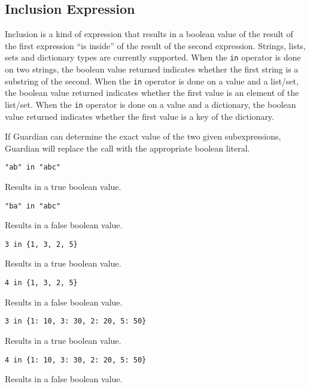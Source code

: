 
\subsection{Inclusion Expression}
{
	Inclusion is a kind of expression that results in a boolean value of
	the result of the first expression ``is inside'' of the result of the
	second expression. Strings, lists, sets and dictionary types are currently
	supported.
	When the \lstinline[language=MAIA, columns=fixed]@in@ operator is done
	on two strings, the boolean value returned
	indicates whether the first string
	is a substring of the second.
	When the \lstinline[language=MAIA, columns=fixed]@in@ operator is done on
	a value and a list/set,
	the boolean value returned indicates whether the first value
	is an element of the list/set.
	When the \lstinline[language=MAIA, columns=fixed]@in@ operator is done on
	a value and a dictionary,
	the boolean value returned indicates whether the first value
	is a key of the dictionary.
	
	If Guardian can determine the exact value of the two given subexpressions,
	Guardian will replace the call with the appropriate boolean literal.
	
	\begin{itemize}
	{
		\item[] \lstinline[language=MAIA, columns=fixed]@"ab" in "abc"@
		
			Results in a true boolean value.
		
		\item[] \lstinline[language=MAIA, columns=fixed]@"ba" in "abc"@
		
			Results in a false boolean value.
		
		\item[] \lstinline[language=MAIA, columns=fixed]@3 in {1, 3, 2, 5}@
		
			Results in a true boolean value.
		
		\item[] \lstinline[language=MAIA, columns=fixed]@4 in {1, 3, 2, 5}@
		
			Results in a false boolean value.
		
		\item[] \lstinline[language=MAIA, columns=fixed]@3 in {1: 10, 3: 30, 2: 20, 5: 50}@
		
			Results in a true boolean value.
		
		\item[] \lstinline[language=MAIA, columns=fixed]@4 in {1: 10, 3: 30, 2: 20, 5: 50}@
		
			Results in a false boolean value.
	}
	\end{itemize}
}
